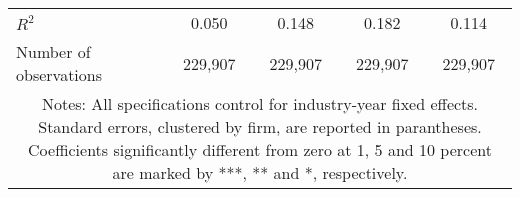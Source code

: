 \begin{tabular}{lcccc}
\\
	$R^2$ 
				& 0.050 
				& 0.148 
				& 0.182 
				& 0.114 \\
	Number of observations 
				& 229,907 
				& 229,907 
				& 229,907 
				& 229,907 \\
\hline \hline
\multicolumn{ 5 }{c}{\begin{minipage}{\textwidth}
\small Notes: All specifications control for industry-year fixed effects. Standard errors, clustered by firm, are reported in parantheses. Coefficients significantly different from zero at 1, 5 and 10 percent are marked by ***, ** and *, respectively.

  \end{minipage} } \\
\end{tabular}
